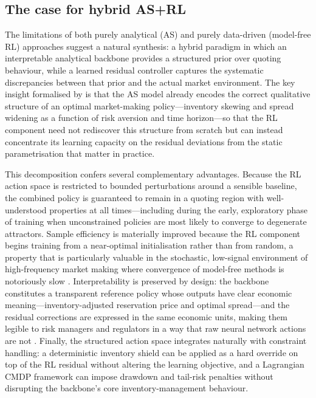 \documentclass[11pt]{article}
\begin{document}
\subsection{The case for hybrid AS+RL}

The limitations of both purely analytical (AS) and purely data-driven
(model-free RL) approaches suggest a natural synthesis: a hybrid
paradigm in which an interpretable analytical backbone provides a
structured prior over quoting behaviour, while a learned residual
controller captures the systematic discrepancies between that prior
and the actual market environment.
The key insight formalised by \textcite{falces2022asrl} is that the AS
model already encodes the correct qualitative structure of an optimal
market-making policy---inventory skewing and spread widening as a
function of risk aversion and time horizon---so that the RL component
need not rediscover this structure from scratch but can instead
concentrate its learning capacity on the residual deviations from the
static parametrisation that matter in practice.

This decomposition confers several complementary advantages.
Because the RL action space is restricted to bounded perturbations around
a sensible baseline, the combined policy is guaranteed to remain in a
quoting region with well-understood properties at all times---including
during the early, exploratory phase of training when unconstrained
policies are most likely to converge to degenerate attractors.
Sample efficiency is materially improved because the RL component begins
training from a near-optimal initialisation rather than from random,
a property that is particularly valuable in the stochastic, low-signal
environment of high-frequency market making where convergence of model-free
methods is notoriously slow \parencite{gasperov2021rlmm}.
Interpretability is preserved by design: the backbone constitutes a
transparent reference policy whose outputs have clear economic
meaning---inventory-adjusted reservation price and optimal spread---and
the residual corrections are expressed in the same economic units,
making them legible to risk managers and regulators in a way that raw
neural network actions are not \parencite{menkveld2013high}.
Finally, the structured action space integrates naturally with
constraint handling: a deterministic inventory shield can be applied
as a hard override on top of the RL residual without altering the
learning objective, and a Lagrangian CMDP framework
\parencite{altschuler2024multi} can impose drawdown and tail-risk
penalties without disrupting the backbone's core inventory-management
behaviour.
\end{document}

